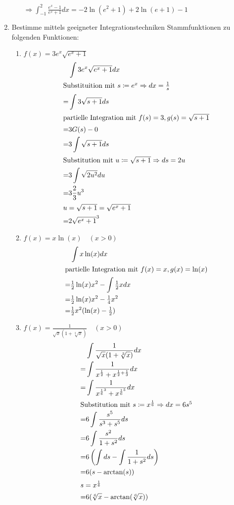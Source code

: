 \documentclass{HM}
\begin{document}
\begin{enumerate}
\begin{enumerate}
			$\Rightarrow \int_{-1}^2\frac{e^x-1}{e^x+1}dx=-2\ln(e^2+1)+2\ln(e+1)-1$
		\end{enumerate}
		\item Bestimme mittels geeigneter Integrationstechniken Stammfunktionen zu folgenden Funktionen:
		\begin{enumerate}
			\item $f(x)=3e^x\sqrt{e^x+1}$
			\begin{align*}
			&\int3e^x\sqrt{e^x+1}dx\\
			\intertext{Substituition mit $s\coloneqq e^x\Rightarrow dx=\frac{1}{s}$}
			=&\int3\sqrt{s+1}ds\\
			\intertext{partielle Integration mit $f(s)=3, g(s)=\sqrt{s+1}$}
			=&3G(s)-0\\
			=&3\int\sqrt{s+1}ds\\
			\intertext{Substitution mit $u\coloneqq\sqrt{s+1}\Rightarrow ds=2u$}
			=&3\int\sqrt{2u^2}du\\
			=&3\frac{2}{3}u^3\\
			\intertext{$u=\sqrt{s+1}=\sqrt{e^x+1}$}
			=&2\sqrt{e^x+1}^3
			\end{align*}
			\item $f(x)= x\ln(x)\quad(x>0)$
			\begin{align*}
			&\int x\ln(x)dx\\
			\intertext{partielle Integration mit $f(x)=x, g(x)=\ln(x)$}
			=&\tfrac{1}{2}\ln(x)x^2-\int\tfrac{1}{2}xdx\\
			=&\tfrac{1}{2}\ln(x)x^2-\tfrac{1}{4}x^2\\
			=&\tfrac{1}{2}x^2(\ln(x)-\tfrac{1}{2})
			\end{align*}
			\item $f(x)=\frac{1}{\sqrt{x}(1+\sqrt[3]{x})} \quad(x>0)$
			\begin{align*}
			&\int\frac{1}{\sqrt{x}(1+\sqrt[3]{x})}dx\\
			=&\int\frac{1}{x^{\frac{1}{2}}+x^{\frac{1}{2}+\frac{1}{3}}}dx\\
			=&\int\frac{1}{x^{\frac{1}{6}^3}+x^{\frac{1}{6}^5}}dx\\
			\intertext{Substitution mit $s\coloneqq x^{\frac{1}{6}}\Rightarrow dx=6s^5$}
			=&6\int\frac{s^5}{s^3+s^5}ds\\
			=&6\int\frac{s^2}{1+s^2}ds\\
			=&6\left(\int ds-\int\frac{1}{1+s^2}ds\right)\\
			=&6(s-\arctan(s))\\
			\intertext{$s=x^{\frac{1}{6}}$}
			=&6(\sqrt[6]{x}-\arctan(\sqrt[6]{x}))

\end{align*}
\end{enumerate}
\end{enumerate}
\end{document}
